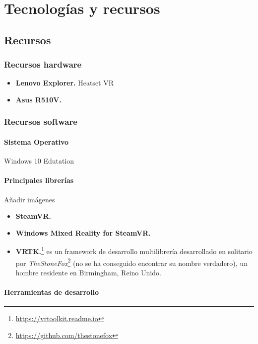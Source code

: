 \chapter{Tecnologías y recursos}
\label{chap:tecnologia}

\section{Recursos}

\subsection{Recursos hardware}

\begin{itemize}
 \item \textbf{Lenovo Explorer.} Heatset VR
 \item \textbf{Asus R510V.}
\end{itemize}

\subsection{Recursos software}

\subsubsection{Sistema Operativo}

Windows 10 Edutation 

\subsubsection{Principales librerías}

Añadir imágenes

\begin{itemize}
    \item \textbf{SteamVR.}
    \item \textbf{Windows Mixed Reality for SteamVR.}
    \item \textbf{VRTK.}\footnote{\url{https://vrtoolkit.readme.io}} es un framework de desarrollo multilibrería desarrollado en solitario por \textit{TheStoneFox}\footnote{\url{https://github.com/thestonefox}} (no se ha conseguido encontrar su nombre verdadero), un hombre residente en Birmingham, Reino Unido.
\end{itemize}

\subsubsection{Herramientas de desarrollo}


